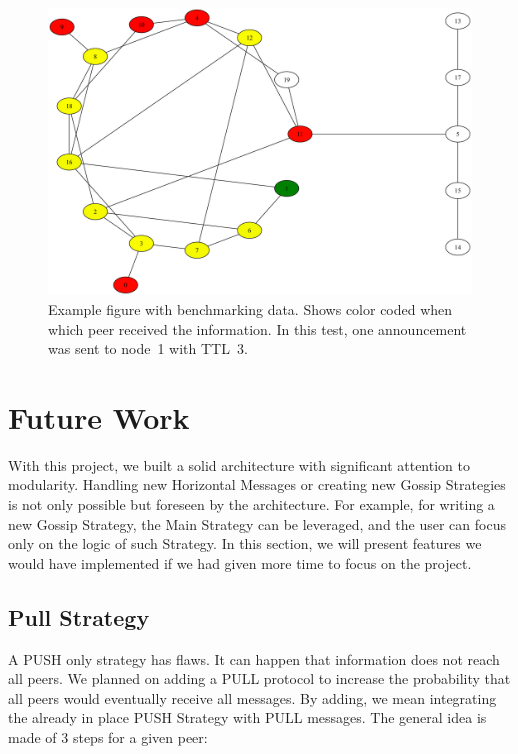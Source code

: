 \documentclass[a4paper,english,10pt,NET]{tumarticle}
\begin{document}
\begin{figure}
	\centering
	\includegraphics[width=1\linewidth]{figures/reached_circo.pdf}
	\caption{
		Example figure with benchmarking data.
		Shows color coded when which peer received the information.
		In this test, one announcement was sent to node~1 with TTL~3.
	}
	\label{fig:reachedWhen}
\end{figure}

\section{Future Work} \label{sec:future}

With this project, we built a solid architecture with significant attention to modularity. Handling new Horizontal Messages or creating new Gossip Strategies is not only possible but foreseen by the architecture. For example, for writing a new Gossip Strategy, the Main Strategy can be leveraged, and the user can focus only on the logic of such Strategy. In this section, we will present features we would have implemented if we had given more time to focus on the project.

\subsection{Pull Strategy}

A PUSH only strategy has flaws. It can happen that information does not reach all peers. We planned on adding a PULL protocol to increase the probability that all peers would eventually receive all messages. By adding, we mean integrating the already in place PUSH Strategy with PULL messages. The general idea is made of 3 steps for a given peer:
\end{document}
